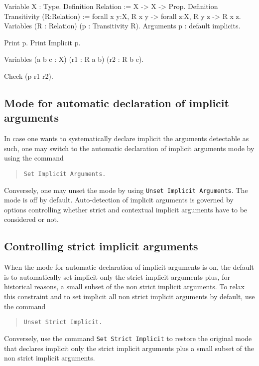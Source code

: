 \begin{coq_example*}
Variable X : Type.
Definition Relation := X -> X -> Prop.
Definition Transitivity (R:Relation) :=
  forall x y:X, R x y -> forall z:X, R y z -> R x z.
Variables (R : Relation) (p : Transitivity R).
Arguments p : default implicits.
\end{coq_example*}
\begin{coq_example}
Print p.
Print Implicit p.
\end{coq_example}
\begin{coq_example*}
Variables (a b c : X) (r1 : R a b) (r2 : R b c).
\end{coq_example*}
\begin{coq_example}
Check (p r1 r2).
\end{coq_example}

\subsection{Mode for automatic declaration of implicit arguments
\label{Auto-implicit}
}

In case one wants to systematically declare implicit the arguments
detectable as such, one may switch to the automatic declaration of
implicit arguments mode by using the command
\begin{quote}
\tt Set Implicit Arguments.
\end{quote}
Conversely, one may unset the mode by using {\tt Unset Implicit
Arguments}.  The mode is off by default. Auto-detection of implicit
arguments is governed by options controlling whether strict and
contextual implicit arguments have to be considered or not.

\subsection{Controlling strict implicit arguments
\label{SetStrictImplicit}}

When the mode for automatic declaration of implicit arguments is on,
the default is to automatically set implicit only the strict implicit
arguments plus, for historical reasons, a small subset of the non
strict implicit arguments. To relax this constraint and to
set implicit all non strict implicit arguments by default, use the command
\begin{quote}
\tt Unset Strict Implicit.
\end{quote}
Conversely, use the command {\tt Set Strict Implicit} to
restore the original mode that declares implicit only the strict implicit arguments plus a small subset of the non strict implicit arguments.

